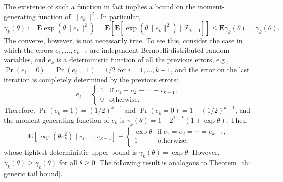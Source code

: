 The existence of such a function in fact implies a bound on the
moment-generating function of $\|e_k\|^2$. In particular,
\begin{equation} \label{eq:mgfbound}
\gamma_k(\theta) := 
\mathbf{E} \exp(\theta\|e_k\|^2) =
\mathbf{E}\left[
      \mathbf{E}\left[
        \exp(\theta\|e_k\|^2)\mid\mathcal{F}_{k-1}
      \right]
    \right]
\le\mathbf{E} \gamma_k(\theta) =
\gamma_k(\theta).
\end{equation}
The converse, however, is not necessarily true. To see this, consider
the case in which the errors $e_1,\ldots,e_{k-1}$ are independent
Bernoulli-distributed random variables, and $e_k$ is a deterministic
function of all the previous errors, e.g., $\Pr(e_i=0) = \Pr(e_i=1) =
1/2$ for $i=1,\ldots,k-1$, and the error on the last iteration is
completely determined by the previous errors:
\[
e_k =
\begin{cases}
  1 & \mbox{if $e_1 = e_2 = \cdots = e_{k-1}$},
\\0 & \mbox{otherwise}.
\end{cases}
\]
Therefore, $\Pr(e_k=1) = (1/2)^{k-1}$ and $\Pr(e_k=0) =
1-(1/2)^{k-1}$, and the moment-generating function of $e_k$ is
$
\gamma_k(\theta) = 1-{2^{1-k}}(1+\exp\theta).
$
Then,
\[
\mathbf{E}[\exp(\theta e_k^2)\mid e_1,\ldots,e_{k-1}] =
\begin{cases}
  \exp\theta   & \mbox{if $e_1 = e_2 = \cdots = e_{k-1}$},
\\1            & \mbox{otherwise,}
\end{cases}
\]
whose tightest deterministic upper bound is
$\gamma_k(\theta)=\exp\theta$. However,
$\gamma_k(\theta)\ge\gamma_k(\theta)$ for all $\theta\ge0$.
The following result is analogous to Theorem~\ref{th: generic tail bound}.

